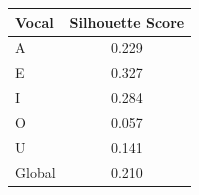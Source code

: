 \begin{tabular}{lc}
\toprule
\rowcolor{col01}
Vocal & Silhouette Score \\
\midrule
A & 0.229 \\
E & 0.327 \\
I & 0.284 \\
O & 0.057 \\
U & 0.141 \\
Global & 0.210 \\
\bottomrule
\end{tabular}
